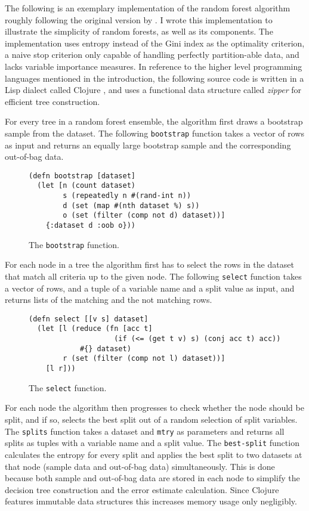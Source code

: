 \documentclass[a4paper,man,12pt,apacite,floatsintext,draftfirst]{apa6} %
\begin{document}
The following is an exemplary implementation of the random forest algorithm
roughly following the original version by .
I wrote this implementation to illustrate the simplicity of random forests,
as well as its components.
The implementation uses entropy instead of the Gini index as the
optimality criterion, a naive stop criterion only capable of handling
perfectly partition-able data, and lacks variable importance measures.
In reference to the higher level programming languages mentioned
in the introduction, the following source code is written in a Lisp
dialect called Clojure \cite{wpCLOJURE}, and uses a functional data structure
called \emph{zipper} \cite{huet1997zipper} for efficient tree construction.

For every tree in a random forest ensemble, the algorithm first draws a
bootstrap sample from the dataset.
The following \texttt{bootstrap} function takes a vector of rows as input
and returns an equally large bootstrap sample and the corresponding out-of-bag data.

\begin{figure}[H]
\caption{The \texttt{bootstrap} function.}
\begin{verbatim}
(defn bootstrap [dataset]
  (let [n (count dataset)
        s (repeatedly n #(rand-int n))
        d (set (map #(nth dataset %) s))
        o (set (filter (comp not d) dataset))]
    {:dataset d :oob o}))
\end{verbatim}
\end{figure}

For each node in a tree the algorithm first has to select the rows in the dataset
that match all criteria up to the given node.
The following \texttt{select} function takes a vector of rows, and a tuple of a variable name
and a split value as input, and returns lists of the matching and the not matching rows.

\begin{figure}[H]
\caption{The \texttt{select} function.}
\begin{verbatim}
(defn select [[v s] dataset]
  (let [l (reduce (fn [acc t]
                    (if (<= (get t v) s) (conj acc t) acc))
            #{} dataset)
        r (set (filter (comp not l) dataset))]
    [l r]))
\end{verbatim}
\end{figure}

For each node the algorithm then progresses to check whether the node should be split,
and if so, selects the best split out of a random selection of split variables.
The \texttt{splits} function takes a dataset and \texttt{mtry} as parameters and
returns all splits as tuples with a variable name and a split value.
The \texttt{best-split} function calculates the entropy for every split and applies
the best split to two datasets at that node (sample data and out-of-bag data) simultaneously.
This is done because both sample and out-of-bag data are stored in each node to
simplify the decision tree construction and the error estimate calculation.
Since Clojure features immutable data structures this increases memory usage only negligibly.
\end{document}
